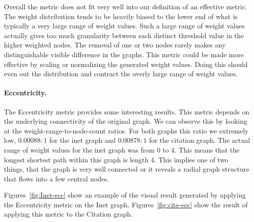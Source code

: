 Overall the metric does not fit very well into our definition of an effective metric.  The weight distribution tends to be heavily biased to the lower end of what is typically a very large range of weight values.  Such a large range of weight values actually gives too much granularity between each distinct threshold value in the higher weighted nodes.  The removal of one or two nodes rarely makes any distinguishable visible difference in the graphs.  This metric could be made more effective by scaling or normalizing the generated weight values.  Doing this should even out the distribution and contract the overly large range of weight values.

\paragraph*{Eccentricity.}
The Eccentricity metric provides some interesting results.  This metric depends on the underlying connectivity of the original graph.  We can observe this by looking at the weight-range-to-node-count ratios.  For both graphs this ratio we extremely low, $0.00088:1$ for the inet graph and $0.00878:1$ for the citation graph.  The actual range of weight values for the inet graph was from 0 to 4.  This means that the longest shortest path within this graph is length 4.  This implies one of two things, that the graph is very well connected or it reveals a radial graph structure that flows into a few central nodes.

Figures~\ref{fig:Inet-ecc} show an example of the visual result generated by applying the Eccentricity metric on the Inet graph.  Figures~\ref{fig:cite-ecc} show the result of applying this metric to the Citation graph.


